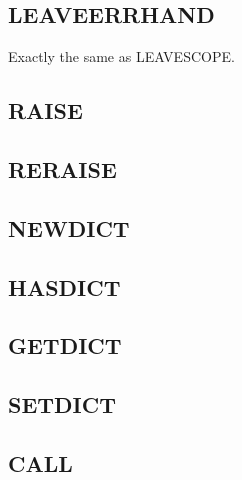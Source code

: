 \subsection{LEAVE\textunderscore{}ERRHAND}
\label{sec:leaveerrhand}
Exactly the same as LEAVE\textunderscore{}SCOPE.

\subsection{RAISE}
\label{sec:raise}

\subsection{RERAISE}
\label{sec:reraise}

\subsection{NEW\textunderscore{}DICT}
\label{sec:newdict}

\subsection{HAS\textunderscore{}DICT}
\label{sec:hasdict}

\subsection{GET\textunderscore{}DICT}
\label{sec:getdict}

\subsection{SET\textunderscore{}DICT}
\label{sec:setdict}

\subsection{CALL}
\label{sec:call}

